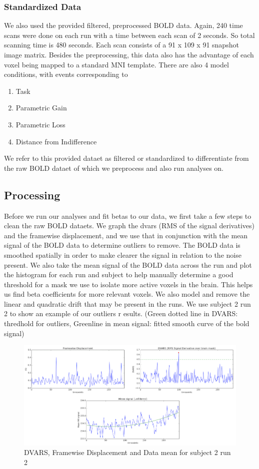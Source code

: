 \documentclass[11pt]{article}
\begin{document}
\subsubsection{Standardized Data}
We also used the provided filtered, preprocessed BOLD data. Again, 240 time 
scans were done on each run with a time between each scan of 2 seconds. So 
total scanning time is 480 seconds. Each scan consists of a 91 x 109 x 91 
snapshot image matrix. Besides the preprocessing, this data also has the 
advantage of each voxel being mapped to a standard MNI template. There are 
also 4 model conditions, with events corresponding to 
\begin{enumerate}
  \item Task
  \item Parametric Gain
  \item Parametric Loss
  \item Distance from Indifference
\end{enumerate}
We refer to this provided dataet as filtered or standardized to differentiate 
from the raw
BOLD dataet of which we preprocess and also run analyses on.

\subsection{Processing}
Before we run our analyses and fit betas to our data, we first take a few 
steps to clean the raw BOLD dataets. We graph the dvars (RMS of the signal 
derivatives) and the framewise displacement, and we use that in conjunction 
with the mean signal of the BOLD data to determine outliers to remove. The 
BOLD data is smoothed spatially in order to make clearer the signal in 
relation to the noise present. We also take the mean signal of the BOLD data 
across the run and plot the histogram for each run and subject to help 
manually determine a good threshold for a mask we use to isolate more active 
voxels in the brain. This helps us find beta coefficients for more relevant 
voxels. We also model and remove the linear and quadratic drift that may be 
present in the runs. We use subject 2 run 2 to show an example of our outliers r
esults. (Green dotted line in DVARS: thredhold for outliers, Greenline in mean 
signal: fitted smooth curve of the bold signal)

\begin{figure}[H]
    \centering
        \includegraphics[scale=0.55]{figures/processing.png}
    \caption{DVARS, Framewise Displacement and Data mean for subject 2 run 2}
\end{figure}
\end{document}

